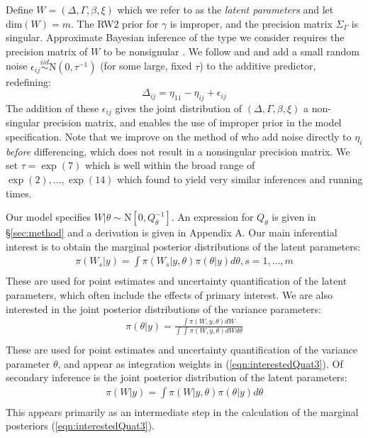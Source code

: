 \documentclass[ba]{imsart}
\begin{document}
Define $W = \left(\Delta, \Gamma,\beta, \xi \right)$ which we refer to as the \textit{latent parameters} and let $\text{dim}(W) = m$. The RW2 prior for $\gamma$ is improper, and the precision matrix $\Sigma_{\Gamma}$ is singular. Approximate Bayesian inference of the type we consider requires the precision matrix of $W$ to be nonsignular \citep{inla,inlacoxph,casecross}. We follow \cite{inla} and \cite{casecross} and add a small random noise $\epsilon_{ij} \stackrel{iid}{\sim} \text{N}(0,\tau^{-1})$ (for some large, fixed $\tau$) to the additive predictor, redefining:
\begin{equation}
\Delta_{ij} = \eta_{11} - \eta_{ij} + \epsilon_{ij}
\end{equation}
The addition of these $\epsilon_{ij}$ gives the joint distribution of $\left(\Delta, \Gamma,\beta, \xi \right)$ a non-singular precision matrix, and enables the use of improper prior in the model specification. Note that we improve on the method of \citet{casecross} who add noise directly to $\eta_{i}$ \emph{before} differencing, which does not result in a nonsingular precision matrix. We set $\tau = \exp(7)$ which is well within the broad range of $\exp(2),\ldots,\exp(14)$ which \cite{casecross} found to yield very similar inferences and running times. 

Our model specifies $W|\theta\sim\text{N}\left[ 0,Q^{-1}_{\theta}\right]$. An expression for $Q_{\theta}$ is given in \S\ref{sec:method} and a derivation is given in Appendix A. Our main inferential interest is to obtain the marginal posterior distributions of the latent parameters:
\begin{equation}\begin{aligned}\label{eqn:interestedQuat3}
\pi(W_{s}|y) = \int \pi(W_{s}|y,\theta) \pi(\theta|y) d\theta, s = 1,\ldots,m  \\
\end{aligned}\end{equation}
These are used for point estimates and uncertainty quantification of the latent parameters, which often include the effects of primary interest. We are also interested in the joint posterior distributions of the variance parameters:
\begin{equation}\begin{aligned}\label{eqn:interestedQuat1}
\pi(\theta|y) = \frac{\int \pi(W,y,\theta) dW}{\int_{} \int_{} \pi(W,y,\theta) dW d\theta } \\
\end{aligned}\end{equation}
These are used for point estimates and uncertainty quantification of the variance parameter $\theta$, and appear as integration weights in (\ref{eqn:interestedQuat3}). Of secondary inference is the joint posterior distribution of the latent parameters:
\begin{equation}\begin{aligned}\label{eqn:interestedQuat2}
\pi(W|y) = \int \pi(W|y,\theta) \pi(\theta|y) d\theta  \\
\end{aligned}\end{equation}
This appears primarily as an intermediate step in the calculation of the marginal posteriors (\ref{eqn:interestedQuat3}).
\end{document}
